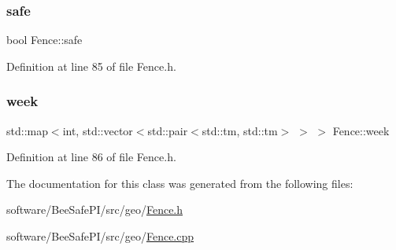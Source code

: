 \mbox{\label{class_fence_ad570430040eee657c625a67d5589c4b5}} 
\subsubsection{\texorpdfstring{safe}{safe}}
{\footnotesize\ttfamily bool Fence\+::safe\hspace{0.3cm}{\ttfamily [private]}}



Definition at line 85 of file Fence.\+h.

\mbox{\label{class_fence_ae589e973fa03316847aeceedd72e2b64}} 
\subsubsection{\texorpdfstring{week}{week}}
{\footnotesize\ttfamily std\+::map$<$int, std\+::vector$<$std\+::pair$<$std\+::tm, std\+::tm$>$ $>$ $>$ Fence\+::week\hspace{0.3cm}{\ttfamily [private]}}



Definition at line 86 of file Fence.\+h.



The documentation for this class was generated from the following files\+:\begin{DoxyCompactItemize}
\item 
software/\+Bee\+Safe\+P\+I/src/geo/\hyperlink{_fence_8h}{Fence.\+h}\item 
software/\+Bee\+Safe\+P\+I/src/geo/\hyperlink{_fence_8cpp}{Fence.\+cpp}\end{DoxyCompactItemize}
